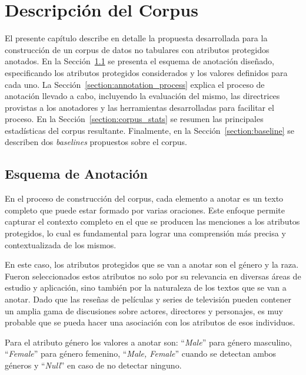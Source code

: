 \chapter{Descripci\'on del Corpus}\label{chapter:proposal}
El presente cap\'itulo describe en detalle la propuesta desarrollada para la construcci\'on de un corpus de datos no tabulares con 
atributos protegidos anotados. En la Secci\'on~\ref{section:annotation_scheme} se presenta el esquema de 
anotaci\'on dise\~nado, especificando los atributos protegidos considerados y los valores definidos para cada uno. La
Secci\'on~\ref{section:annotation_process} explica el proceso de anotaci\'on llevado a cabo, incluyendo la evaluaci\'on del 
mismo, las directrices provistas a los anotadores y las herramientas desarrolladas para facilitar el proceso. En la
Secci\'on~\ref{section:corpus_stats} se resumen las principales estad\'isticas del corpus resultante. Finalmente, en la 
Secci\'on~\ref{section:baseline} se describen dos \emph{baselines} propuestos sobre el corpus.

\section{Esquema de Anotaci\'on}\label{section:annotation_scheme}
En el proceso de construcci\'on del corpus, cada elemento a anotar es un texto completo que puede estar formado por varias oraciones. 
Este enfoque permite capturar el contexto completo en el que se producen las menciones a los atributos protegidos, lo cual es fundamental
para lograr una comprensi\'on m\'as precisa y contextualizada de los mismos.

En este caso, los atributos protegidos que se van a anotar son el g\'enero y la raza.
Fueron seleccionados estos atributos no solo por su relevancia en diversas \'areas de estudio y aplicaci\'on, sino tambi\'en 
por la naturaleza de los textos que se van a anotar. Dado que las rese\~nas de pel\'iculas y series de televisi\'on
pueden contener un amplia gama de discusiones sobre actores, directores y personajes, es muy probable que se pueda hacer una 
asociaci\'on con los atributos de esos individuos.

Para el atributo g\'enero los valores a anotar son: ``\emph{Male}'' para g\'enero masculino, ``\emph{Female}'' para g\'enero femenino, 
``\emph{Male, Female}'' cuando se detectan ambos g\'eneros y ``\emph{Null}'' en caso de no detectar ninguno.


